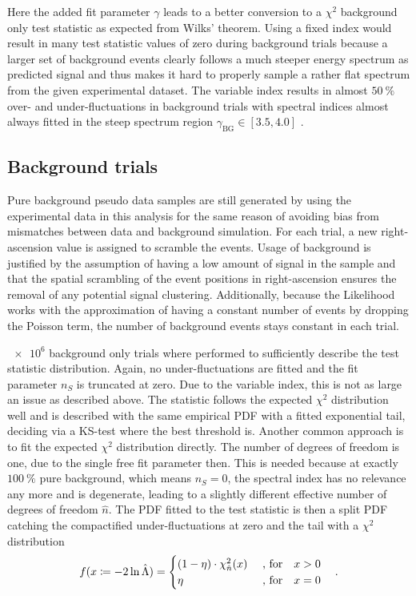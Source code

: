 Here the added fit parameter $\gamma$ leads to a better conversion to a $\chi^2$ background only test statistic as expected from Wilks' theorem.
Using a fixed index would result in many test statistic values of zero during background trials because a larger set of background events clearly follows a much steeper energy spectrum as predicted signal and thus makes it hard to properly sample a rather flat spectrum from the given experimental dataset.
The variable index results in almost $\SI{50}{\percent}$ over- and under-fluctuations in background trials with spectral indices almost always fitted in the steep spectrum region $\gamma_\text{BG}\in[3.5, 4.0]$ .

\subsection*{Background trials}
Pure background pseudo data samples are still generated by using the experimental data in this analysis for the same reason of avoiding bias from mismatches between data and background simulation.
For each trial, a new right-ascension value is assigned to scramble the events.
Usage of background is justified by the assumption of having a low amount of signal in the sample and that the spatial scrambling of the event positions in right-ascension ensures the removal of any potential signal clustering.
Additionally, because the Likelihood works with the approximation of having a constant number of events by dropping the Poisson term, the number of background events stays constant in each trial.

$\num{e6}$ background only trials where performed to sufficiently describe the test statistic distribution.
Again, no under-fluctuations are fitted and the fit parameter $n_S$ is truncated at zero.
Due to the variable index, this is not as large an issue as described above.
The statistic follows the expected $\chi^2$ distribution well and is described with the same empirical PDF with a fitted exponential tail, deciding via a KS-test where the best threshold is.
Another common approach is to fit the expected $\chi^2$ distribution directly.
The number of degrees of freedom is one, due to the single free fit parameter then.
This is needed because at exactly $\SI{100}{\percent}$ pure background, which means $n_S=0$, the spectral index has no relevance any more and is degenerate, leading to a slightly different effective number of degrees of freedom $\hat{n}$.
The PDF fitted to the test statistic is then a split PDF catching the compactified under-fluctuations at zero and the tail with a $\chi^2$ distribution 
\begin{equation}
  f(x \coloneqq -2\ln\hat{\Lambda}) =
  \begin{cases}
    (1 - \eta) \cdot \chi^2_{\hat{n}}(x) &\text{ , for}\quad x > 0 \\
    \eta &\text{ , for}\quad x = 0
  \end{cases}
  \quad\text{.}
\end{equation}

